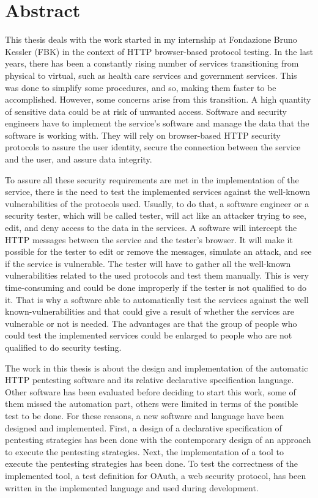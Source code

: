 \chapter*{Abstract} %

This thesis deals with the work started in my internship at Fondazione Bruno Kessler (FBK) in the context of HTTP browser-based protocol testing.
In the last years, there has been a constantly rising number of services transitioning from physical to virtual, such as health care services and government services. This was done to simplify some procedures, and so, making them faster to be accomplished. However, some concerns arise from this transition. A high quantity of sensitive data could be at risk of unwanted access. Software and security engineers have to implement the service's software and manage the data that the software is working with. They will rely on browser-based HTTP security protocols to assure the user identity, secure the connection between the service and the user, and assure data integrity. 

To assure all these security requirements are met in the implementation of the service, there is the need to test the implemented services against the well-known vulnerabilities of the protocols used. Usually, to do that, a software engineer or a security tester, which will be called tester, will act like an attacker trying to see, edit, and deny access to the data in the services. A software will intercept the HTTP messages between the service and the tester's browser. It will make it possible for the tester to edit or remove the messages, simulate an attack, and see if the service is vulnerable. The tester will have to gather all the well-known vulnerabilities related to the used protocols and test them manually. This is very time-consuming and could be done improperly if the tester is not qualified to do it. That is why a software able to automatically test the services against the well known-vulnerabilities and that could give a result of whether the services are vulnerable or not is needed. The advantages are that the group of people who could test the implemented services could be enlarged to people who are not qualified to do security testing.

The work in this thesis is about the design and implementation of the automatic HTTP pentesting software and its relative declarative specification language. Other software has been evaluated before deciding to start this work, some of them missed the automation part, others were limited in terms of the possible test to be done. For these reasons, a new software and language have been designed and implemented. First, a design of a declarative specification of pentesting strategies has been done with the contemporary design of an approach to execute the pentesting strategies. Next, the implementation of a tool to execute the pentesting strategies has been done. To test the correctness of the implemented tool, a test definition for \gls{OAuth}, a web security protocol, has been written in the implemented language and used during development.

